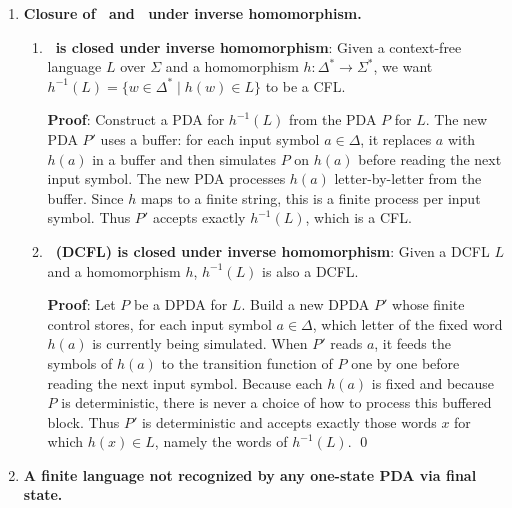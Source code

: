 \begin{enumerate}[{10.}1. ]
\begin{enumerate}
\item \textbf{Grammar from PDA}: Applying Definition 10.7 to part (a) and simplifying gives an equivalent grammar such as
\[
S\rightarrow \pmb{a}S\pmb{c}\mid \pmb{c}S\pmb{a}\mid \pmb{b}S\pmb{c}\mid
\pmb{c}S\pmb{b}\mid SS\mid \lambda.
\]
Each production preserves the invariant $|x|_{\pmb{a}}+|x|_{\pmb{b}}=|x|_{\pmb{c}}$, and every nonempty balanced word can be split at some point into one balanced word or into a balanced word bracketed by one of the four possible outer pairs.
\end{enumerate}

\item \textbf{Closure of \PSIG\ and \ASIG\ under inverse homomorphism.}

\begin{enumerate}
\item \textbf{\PSIG\ is closed under inverse homomorphism}: Given a context-free language $L$ over $\Sigma$ and a homomorphism $h: \Delta^* \to \Sigma^*$, we want $h^{-1}(L) = \{w \in \Delta^* \mid h(w) \in L\}$ to be a CFL.

\textbf{Proof}: Construct a PDA for $h^{-1}(L)$ from the PDA $P$ for $L$. The new PDA $P'$ uses a buffer: for each input symbol $a\in\Delta$, it replaces $a$ with $h(a)$ in a buffer and then simulates $P$ on $h(a)$ before reading the next input symbol. The new PDA processes $h(a)$ letter-by-letter from the buffer. Since $h$ maps to a finite string, this is a finite process per input symbol. Thus $P'$ accepts exactly $h^{-1}(L)$, which is a CFL.

\item \textbf{\ASIG\ (DCFL) is closed under inverse homomorphism}: Given a DCFL $L$ and a homomorphism $h$, $h^{-1}(L)$ is also a DCFL.

\textbf{Proof}: Let $P$ be a DPDA for $L$. Build a new DPDA $P'$ whose finite
control stores, for each input symbol $a\in\Delta$, which letter of the fixed
word $h(a)$ is currently being simulated. When $P'$ reads $a$, it feeds the
symbols of $h(a)$ to the transition function of $P$ one by one before reading
the next input symbol. Because each $h(a)$ is fixed and because $P$ is
deterministic, there is never a choice of how to process this buffered block.
Thus $P'$ is deterministic and accepts exactly those words $x$ for which
$h(x)\in L$, namely the words of $h^{-1}(L)$. \qed
\end{enumerate}

\item \textbf{A finite language not recognized by any one-state PDA via final state.}


\end{enumerate}
